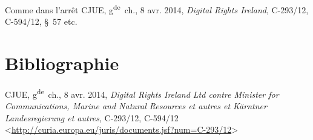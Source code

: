 \documentclass[french,]{article}
\begin{document}
Comme dans l'arrêt CJUE, g\textsuperscript{de}~ch., 8 avr. 2014,
\emph{Digital Rights Ireland}, C-293/12, C-594/12, §~57 etc.

\section*{Bibliographie}\label{bibliographie}

CJUE, g\textsuperscript{de}~ch., 8 avr. 2014, \emph{Digital Rights
Ireland Ltd contre Minister for Communications, Marine and Natural
Resources et autres et Kärntner Landesregierung et autres}, C-293/12,
C-594/12
\textless{}\url{http://curia.europa.eu/juris/documents.jsf?num=C-293/12}\textgreater{}
\end{document}
